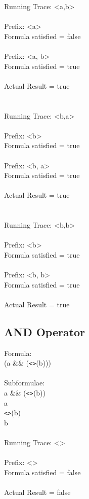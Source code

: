 \noindent Running Trace: \textless a,b\textgreater\\
\\
  Prefix: \textless a\textgreater\\
  Formula satisfied = false\\
\\
  Prefix: \textless a, b\textgreater\\
  Formula satisfied = true\\
\\
  Actual Result = true\\
\\
\\
Running Trace: \textless b,a\textgreater\\
\\
  Prefix: \textless b\textgreater\\
  Formula satisfied = true\\
\\
  Prefix: \textless b, a\textgreater\\
  Formula satisfied = true\\
\\
  Actual Result = true\\
\\
\\
Running Trace: \textless b,b\textgreater\\
\\
  Prefix: \textless b\textgreater\\
  Formula satisfied = true\\
\\
  Prefix: \textless b, b\textgreater\\
  Formula satisfied = true\\
\\
  Actual Result = true\\

\subsection{AND Operator}

Formula:\\
(a \&\& (\texttt{<>}(b)))\\
\\
Subformulae:\\
a \&\& (\texttt{<>}(b))\\
a\\
\texttt{<>}(b)\\
b\\
\\
Running Trace: \textless \textgreater\\
\\
  Prefix: \textless \textgreater\\
  Formula satisfied = false\\
\\
  Actual Result = false\\

